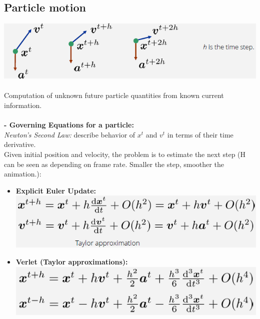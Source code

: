 \documentclass{article}
\begin{document}
\subsection{Particle motion}
\includegraphics[scale=0.5]{91.png}\\\\
Computation of unknown future particle quantities from known current information.\\\\
\textbf{- Governing Equations for a particle: }\\
\textit{Newton's Second Law: }describe behavior of $x^t$ and $v^t$ in terms of their time derivative. \\
Given initial position and velocity, the problem is to estimate the next step (H can be seen as depending on frame rate. Smaller the step, smoother the animation.):\\
\begin{itemize}
\item \textbf{Explicit Euler Update: }\\
\includegraphics[scale=0.5]{image91.png}\\
\item \textbf{Verlet (Taylor approximations): }\\
\includegraphics[scale=0.5]{image92.png}
\end{itemize}
\end{document}
